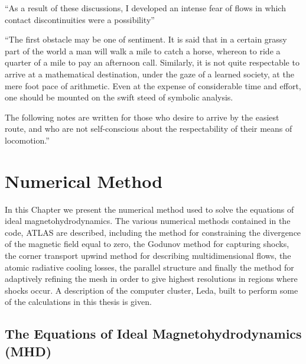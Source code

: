 \begin{savequote}

``As a result of these discussions, I developed an intense fear of flows in which contact discontinuities were a possibility''

``The first obstacle may be one of sentiment. It is said that in a certain
grassy part of the world a man will walk a mile to catch a horse, whereon to
ride a quarter of a mile to pay an afternoon call. Similarly, it is not quite
respectable to arrive at a mathematical destination, under the gaze of a
learned society, at the mere foot pace of arithmetic. Even at the expense of
considerable time and effort, one should be mounted on the swift steed of
symbolic analysis.

The following notes are written for those who desire to arrive by the easiest
route, and who are not self-conscious about the respectability of their means
of locomotion.''


\end{savequote}

\chapter{Numerical Method}
\label{NumericalMethod}


In this Chapter we present the numerical method used to solve the equations of
ideal magnetohydrodynamics. The various numerical methods contained in the code,
ATLAS are described, including
the method for constraining the divergence of the magnetic field equal to zero, 
the Godunov method for capturing shocks,
the corner transport upwind method for describing multidimensional flows,
the atomic radiative cooling losses,
the parallel structure and finally the method for adaptively refining the mesh in
order to give highest resolutions in regions where shocks occur.
A description of the computer cluster, Leda, built to perform some of the calculations
in this thesis is given.

\section{The Equations of Ideal Magnetohydrodynamics (MHD)}
\label{EquationsofIdealMagnetohydrodynamicsMHD}

